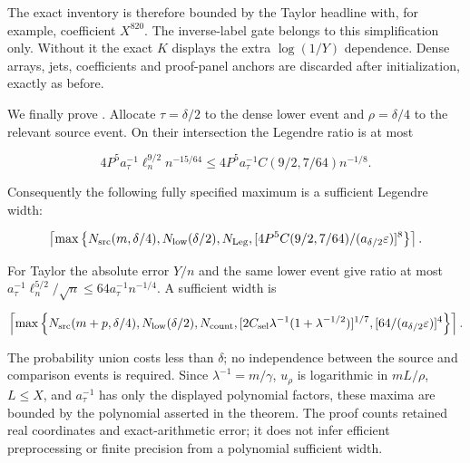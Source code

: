 The exact inventory is therefore bounded by the Taylor headline with,
for example, coefficient $X^{820}$. The inverse-label gate belongs to
this simplification only. Without it the exact $K$ displays the extra
$\log(1/Y)$ dependence. Dense arrays, jets, coefficients and proof-panel
anchors are discarded after initialization, exactly as before.

We finally prove . Allocate $\tau=\delta/2$
to the dense lower event and $\rho=\delta/4$ to the relevant source event.
On their intersection the Legendre ratio is at most

\[
4P^5a_\tau^{-1}\ell_n^{9/2}n^{-15/64}
 \le4P^5a_\tau^{-1}C(9/2,7/64)n^{-1/8}.
\]

Consequently the following fully specified maximum is a sufficient
Legendre width:

\begin{equation}
\left\lceil\max\left\{
 N_{\rm src}(m,\delta/4),N_{\rm low}(\delta/2),N_{\rm Leg},
 [4P^5C(9/2,7/64)/(a_{\delta/2}\varepsilon)]^8
 \right\}\right\rceil.
\label{cp:poly:eq:legendre-final-width}
\end{equation}

For Taylor the absolute error $Y/n$ and the same lower event give ratio
at most $a_\tau^{-1}\ell_n^{5/2}/\sqrt n\le64a_\tau^{-1}n^{-1/4}$.
A sufficient width is

\begin{equation}
\left\lceil\max\left\{
N_{\rm src}(m+p,\delta/4),N_{\rm low}(\delta/2),N_{\rm count},
[2C_{\rm sel}\lambda^{-1}(1+\lambda^{-1/2})]^{1/7},
[64/(a_{\delta/2}\varepsilon)]^4
\right\}\right\rceil.
\label{cp:poly:eq:taylor-final-width}
\end{equation}

The probability union costs less than $\delta$; no independence between
the source and comparison events is required. Since
$\lambda^{-1}=m/\gamma$, $u_\rho$ is logarithmic in $mL/\rho$,
$L\le X$, and $a_\tau^{-1}$ has only the displayed polynomial factors,
these maxima are bounded by the polynomial asserted in the theorem.
The proof counts retained real coordinates and exact-arithmetic error;
it does not infer efficient preprocessing or finite precision from a
polynomial sufficient width.
